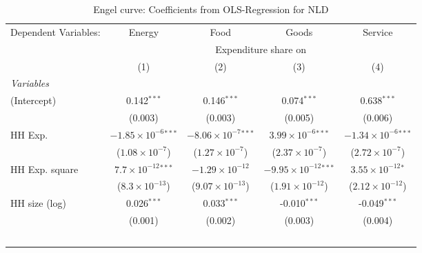 
\begin{table}[htbp!]
   \centering
   \small
   \begin{adjustbox}{width = 1\textwidth, max height = 0.95\textheight, center}
      \begin{threeparttable}[b]
         \caption{\label{tab:Engel_parametric_NLD} Engel curve: Coefficients from OLS-Regression for NLD}
         \begin{tabular}{lcccc}
            \tabularnewline \midrule \midrule
            Dependent Variables: & Energy                         & Food                           & Goods                           & Service\\  
             & \multicolumn{4}{c}{Expenditure share on} \\ 
                                 & (1)                            & (2)                            & (3)                             & (4)\\  
            \midrule
            \emph{Variables}\\
            (Intercept)          & 0.142$^{***}$                  & 0.146$^{***}$                  & 0.074$^{***}$                   & 0.638$^{***}$\\   
                                 & (0.003)                        & (0.003)                        & (0.005)                         & (0.006)\\   
            HH Exp.              & $-1.85\times 10^{-6}$$^{***}$  & $-8.06\times 10^{-7}$$^{***}$  & $3.99\times 10^{-6}$$^{***}$    & $-1.34\times 10^{-6}$$^{***}$\\    
                                 & ($1.08\times 10^{-7}$)         & ($1.27\times 10^{-7}$)         & ($2.37\times 10^{-7}$)          & ($2.72\times 10^{-7}$)\\    
            HH Exp. square       & $7.7\times 10^{-12}$$^{***}$   & $-1.29\times 10^{-12}$         & $-9.95\times 10^{-12}$$^{***}$  & $3.55\times 10^{-12}$$^{*}$\\    
                                 & ($8.3\times 10^{-13}$)         & ($9.07\times 10^{-13}$)        & ($1.91\times 10^{-12}$)         & ($2.12\times 10^{-12}$)\\    
            HH size (log)        & 0.026$^{***}$                  & 0.033$^{***}$                  & -0.010$^{***}$                  & -0.049$^{***}$\\   
                                 & (0.001)                        & (0.002)                        & (0.003)                         & (0.004)\\   
$$
\end{tabular}
\end{threeparttable}
\end{adjustbox}
\end{table}
